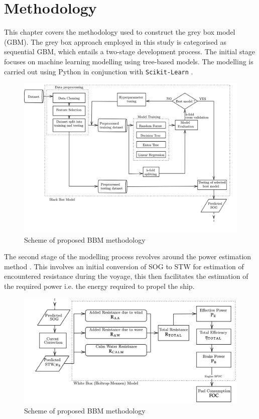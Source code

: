 \documentclass[]{interact}
\theoremstyle{plain}%
\theoremstyle{definition}
\theoremstyle{remark}
\begin{document}
\section{Methodology}\label{sec:big_methodology}

This chapter covers the methodology used to construct the grey box model (GBM). The grey box approach employed in this study is categorised as sequential GBM, which entails a two-stage development process. The initial stage focuses on machine learning modelling using tree-based models. The modelling is carried out using Python in conjunction with \texttt{Scikit-Learn} \citep{FabianPedregosa.2011}. 
\begin{figure}[h]
  \centering
      \includegraphics[width=.75\textwidth]{00_figures/flowmethod_BBM_alt.png}
      \caption{Scheme of proposed BBM methodology}
      \label{fig:flowchart_BBM}
\end{figure}

The second stage of the modelling process revolves around the power estimation method \citep{Holtrop.1984}. This involves an initial conversion of SOG to STW for estimation of encountered resistance during the voyage, this then facilitates the estimation of the required power i.e. the energy required to propel the ship.

\begin{figure}[h]
  \centering
      \includegraphics[width=.75\textwidth]{00_figures/flowmethod_WBM.png}
      \caption{Scheme of proposed BBM methodology}
      \label{fig:flowchart_GBM}
\end{figure}
\end{document}
